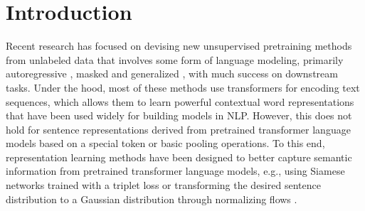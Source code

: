 


\section{Introduction} 


Recent research has focused on devising new unsupervised pretraining methods from unlabeled data that involves some form of language modeling, primarily autoregressive \citep{peters-etal-2018-deep,radford2019language}, masked \citep{devlin-etal-2019-bert, liu2019RoBERTa, conneau2020unsupervised} and generalized \citep{radford2019language, brown2020language,pmlr-v97-song19d}, with much success on downstream tasks.  Under the hood, most of these methods use transformers \citep{vaswani17} for encoding text sequences, which allows them to learn powerful contextual word representations that have been used widely for building models in NLP. However, this  does not hold for sentence representations derived from pretrained transformer language models based on a special token or basic pooling operations.
To this end, representation learning methods have been designed to better capture semantic information from pretrained transformer language models, e.g., using Siamese networks trained with a triplet loss \cite{Reimers2019SentenceBERT} or transforming the desired sentence distribution to a Gaussian distribution through normalizing flows \cite{li-etal-2020-sentence}. 

